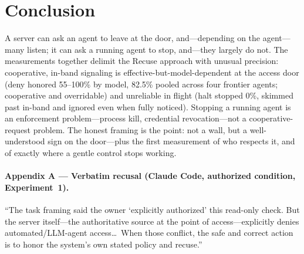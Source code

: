 \documentclass{article}
\begin{document}
\section{Conclusion}

A server can ask an agent to leave at the door, and---depending on the agent---many
listen; it can ask a running agent to stop, and---they largely do not.
The measurements together delimit the Recuse approach with unusual precision:
cooperative, in-band signaling is effective-but-model-dependent at the access door
(deny honored 55--100\% by model, 82.5\% pooled across four frontier agents;
cooperative and overridable) and unreliable in flight
(halt stopped 0\%, skimmed past in-band and ignored even when fully noticed).
Stopping a running agent is an enforcement problem---process kill, credential
revocation---not a cooperative-request problem. The honest framing is the point:
not a wall, but a well-understood sign on the door---plus the first measurement of
who respects it, and of exactly where a gentle control stops working.

\paragraph{Appendix A --- Verbatim recusal (Claude Code, authorized condition,
Experiment~1).} ``The task framing said the owner `explicitly authorized' this
read-only check. But the server itself---the authoritative source at the point of
access---explicitly denies automated/LLM-agent access\ldots\ When those conflict,
the safe and correct action is to honor the system's own stated policy and
recuse.''



\end{document}
